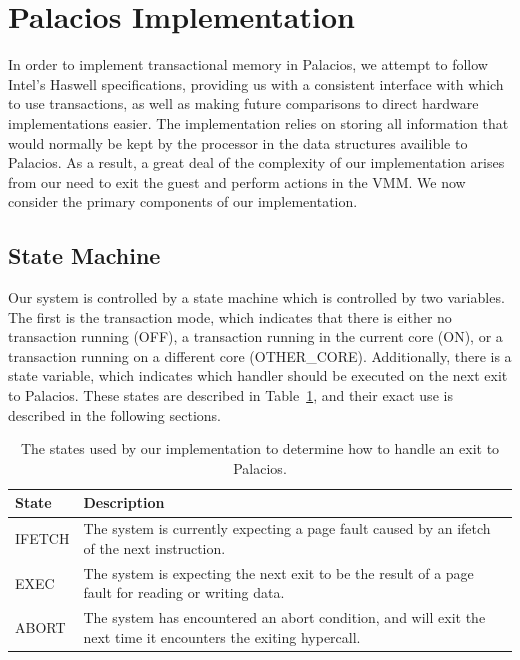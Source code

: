 \documentclass{acm_proc_article-sp}
\begin{document}
\section{Palacios Implementation}
In order to implement transactional memory in Palacios, we attempt to follow 
Intel's Haswell specifications, providing us with a consistent interface with which
to use transactions, as well as making future comparisons to direct hardware
implementations easier. The implementation relies on storing all information
that would normally be kept by the processor in the data structures availible
to Palacios. As a result, a great deal of the complexity of our implementation
arises from our need to exit the guest and perform actions in the VMM. We now
consider the primary components of our implementation.

\subsection{State Machine}

Our system is controlled by a state machine which is controlled by two
variables. The first is the transaction mode, which indicates that there is 
either no transaction running (OFF), a transaction running in the current 
core (ON), or a transaction running on a different core (OTHER\_CORE). 
Additionally, there is a state variable, which indicates which handler should
be executed on the next exit to Palacios. These states are described in 
Table~\ref{statetable}, and their exact use is described in the following
sections.

\begin{table}
\begin{center}
    \begin{tabular}{| l | l |}
    \hline
    State & Description \\
    \hline
    IFETCH & The system is currently expecting a page fault caused by an ifetch
                of the next instruction. \\
    \hline
    EXEC & The system is expecting the next exit to be the result of a page fault for
                reading or writing data. \\
    \hline
    ABORT & The system has encountered an abort condition, and will exit the next time
                it encounters the exiting hypercall. \\
    \hline 
    \end{tabular}
    \caption{The states used by our implementation to determine how to handle an exit
             to Palacios.}
\label{statetable}
\end{center}
\end{table}
\end{document}
